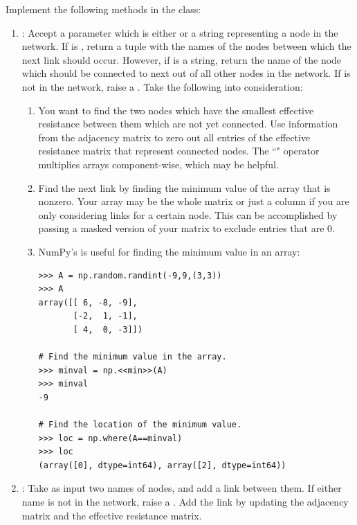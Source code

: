 \begin{problem}
Implement the following methods in the  class:

\begin{enumerate}
\item {}: Accept a parameter  which is either  or a string representing a node in the network. If  is , return a tuple with the names of the nodes between which the next link should occur. However, if  is a string, return the name of the node which should be connected to  next out of all other nodes in the network. If  is not in the network, raise a . Take the following into consideration:

\begin{enumerate}
\item You want to find the two nodes which have the smallest effective resistance between them which are not yet connected.
Use information from the adjacency matrix to zero out all entries of the effective resistance matrix that represent connected nodes. The ``\li{*}" operator multiplies arrays component-wise, which may be helpful.

\item Find the next link by finding the minimum value of the array that is nonzero.
Your array may be the whole matrix or just a column if you are only considering links for a certain node.
This can be accomplished by passing  a masked version of your matrix to exclude entries that are $0$.

\item NumPy's  is useful for finding the minimum value in an array:

\begin{lstlisting}
>>> A = np.random.randint(-9,9,(3,3))
>>> A
array([[ 6, -8, -9],
       [-2,  1, -1],
       [ 4,  0, -3]])

# Find the minimum value in the array.
>>> minval = np.<<min>>(A)
>>> minval
-9

# Find the location of the minimum value.
>>> loc = np.where(A==minval)
>>> loc
(array([0], dtype=int64), array([2], dtype=int64))
\end{lstlisting}
\end{enumerate}


\item {}: Take as input two names of nodes, and add a link between them. If either name is not in the network, raise a . Add the link by updating the adjacency matrix and the effective resistance matrix.
\end{enumerate}


\end{problem}
